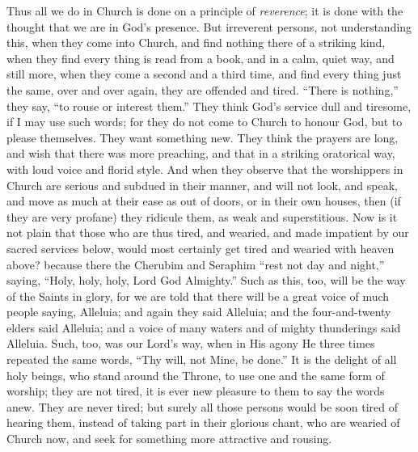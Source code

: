 Thus all we do in Church is done on a principle of \emph{reverence};
it is done with the thought that we are in God's presence. But
irreverent persons, not understanding this, when they come into
Church, and find nothing there of a striking kind, when they find
every thing is read from a book, and in a calm, quiet way, and still
more, when they come a second and a third time, and find every thing
just the same, over and over again, they are offended and tired.
``There is nothing,'' they say, ``to rouse or interest
them.'' They think God's service dull and tiresome, if I may use
such words; for they do not come to Church to honour God, but to
please themselves. They want something new. They think the prayers are
long, and wish that there was more preaching, and that in a striking
oratorical way, with loud voice and florid style. And when they
observe that the worshippers in Church are serious and subdued in
their manner, and will not look, and speak, and move as much at their
ease as out of doors, or in their own houses, then (if they are very
profane) they ridicule them, as weak and superstitious. Now is it not
plain that those who are thus tired, and wearied, and made impatient
by our sacred services below, would most certainly get tired and
wearied with heaven above? because there the Cherubim and Seraphim
``rest not day and night,'' saying, ``Holy, holy, holy,
Lord God Almighty.'' Such as this, too, will be the way of the
Saints in glory, for we are told that there will be a great voice of
much people saying, Alleluia; and again they said Alleluia; and the
four-and-twenty elders said Alleluia; and a voice of many waters and
of mighty thunderings said Alleluia. Such, too, was our Lord's way,
when in His agony He three times repeated the same words, ``Thy
will, not Mine, be done.'' It is the delight of all holy beings,
who stand around the Throne, to use one and the same form of worship;
they are not tired, it is ever new pleasure to them to say the words
anew. They are never tired; but surely all those persons would be soon
tired of hearing them, instead of taking part in their glorious chant,
who are wearied of Church now, and seek for something more attractive
and rousing.

